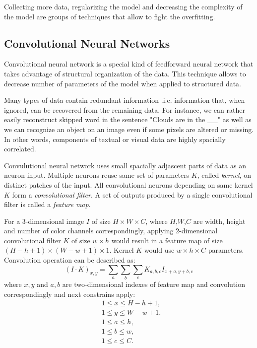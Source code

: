 Collecting more data, regularizing the model and decreasing the complexity of the model are groups of techniques that allow to fight the overfitting.




\subsection{Convolutional Neural Networks}
\label{ch:cnn}

Convolutional neural network is a special kind of feedforward neural network that takes advantage of structural organization of the data. This technique allows to decrease number of parameters of the model when applied to structured data.

Many types of data contain redundant information .i.e. information that, when ignored, can be recovered from the remaining data.
For instance, we can rather easily reconstruct skipped word in the sentence "Clouds are in the \_\_" as well as we can recognize an object on an image even if some pixels are altered or missing.
In other words, components of textual or visual data are highly spacially correlated.

Convulutional neural network uses small spacially adjascent parts of data as an neuron input. Multiple neurons reuse same set of parameters $K$, called \textit{kernel}, on distinct patches of the input. All convolutional neurons depending on same kernel $K$ form a \textit{convolutional filter}. A set of outputs produced by a single convolutional filter is called a \textit{feature map}.



For a 3-dimensional image $I$ of size $H \times W \times C$, where $H$,$W$,$C$ are width, height and number of color channels correspondingly, applying 2-dimensional convolutional filter $K$ of size $w \times h$ would result in a feature map of size $(H-h+1) \times (W-w+1) \times 1$. Kernel $K$ would use $w \times h \times C$ parameters. Convolution operation can be described as:
\begin{equation}\label{eq:conv}
  (I \cdot K)_{x, y} = \sum_a \sum_b \sum_c K_{a,b,c} I_{x+a, y+b,c}
\end{equation}
where ${x, y}$ and ${a,b}$ are two-dimensional indexes of feature map and convolution correspondingly and next constrains apply:
\begin{equation*}
  \begin{aligned}
  &1 \leq  x \leq H-h+1, \\
  &1 \leq  y \leq W-w+1, \\
  &1 \leq  a \leq h, \\
  &1 \leq  b \leq w, \\
  &1 \leq  c \leq C.
\end{aligned}
\end{equation*}

